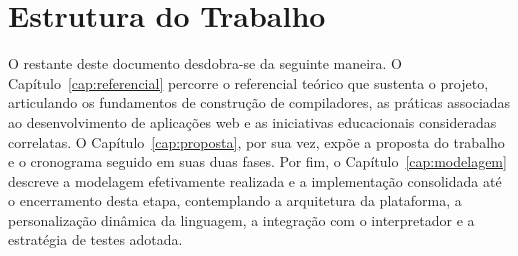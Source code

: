 \section{Estrutura do Trabalho}

O restante deste documento desdobra-se da seguinte maneira. O Capítulo~\ref{cap:referencial} percorre o referencial teórico que sustenta o projeto, articulando os fundamentos de construção de compiladores, as práticas associadas ao desenvolvimento de aplicações web e as iniciativas educacionais consideradas correlatas. O Capítulo~\ref{cap:proposta}, por sua vez, expõe a proposta do trabalho e o cronograma seguido em suas duas fases. Por fim, o Capítulo~\ref{cap:modelagem} descreve a modelagem efetivamente realizada e a implementação consolidada até o encerramento desta etapa, contemplando a arquitetura da plataforma, a personalização dinâmica da linguagem, a integração com o interpretador e a estratégia de testes adotada.
